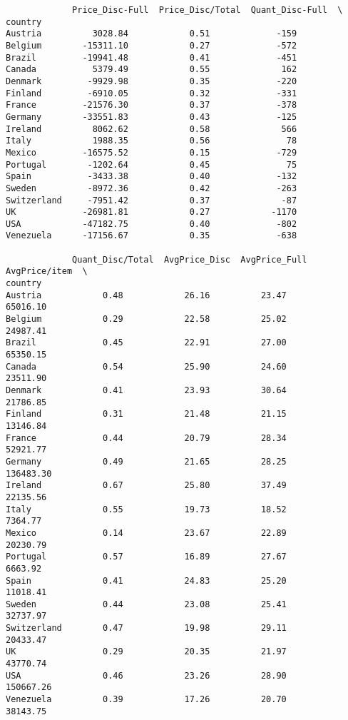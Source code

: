 \documentclass[11pt]{article}
\begin{document}
    
    \begin{verbatim}
             Price_Disc-Full  Price_Disc/Total  Quant_Disc-Full  \
country                                                           
Austria          3028.84            0.51             -159         
Belgium        -15311.10            0.27             -572         
Brazil         -19941.48            0.41             -451         
Canada           5379.49            0.55              162         
Denmark         -9929.98            0.35             -220         
Finland         -6910.05            0.32             -331         
France         -21576.30            0.37             -378         
Germany        -33551.83            0.43             -125         
Ireland          8062.62            0.58              566         
Italy            1988.35            0.56               78         
Mexico         -16575.52            0.15             -729         
Portugal        -1202.64            0.45               75         
Spain           -3433.38            0.40             -132         
Sweden          -8972.36            0.42             -263         
Switzerland     -7951.42            0.37              -87         
UK             -26981.81            0.27            -1170         
USA            -47182.75            0.40             -802         
Venezuela      -17156.67            0.35             -638         

             Quant_Disc/Total  AvgPrice_Disc  AvgPrice_Full  AvgPrice/item  \
country                                                                      
Austria            0.48            26.16          23.47         65016.10     
Belgium            0.29            22.58          25.02         24987.41     
Brazil             0.45            22.91          27.00         65350.15     
Canada             0.54            25.90          24.60         23511.90     
Denmark            0.41            23.93          30.64         21786.85     
Finland            0.31            21.48          21.15         13146.84     
France             0.44            20.79          28.34         52921.77     
Germany            0.49            21.65          28.25        136483.30     
Ireland            0.67            25.80          37.49         22135.56     
Italy              0.55            19.73          18.52          7364.77     
Mexico             0.14            23.67          22.89         20230.79     
Portugal           0.57            16.89          27.67          6663.92     
Spain              0.41            24.83          25.20         11018.41     
Sweden             0.44            23.08          25.41         32737.97     
Switzerland        0.47            19.98          29.11         20433.47     
UK                 0.29            20.35          21.97         43770.74     
USA                0.46            23.26          28.90        150667.26     
Venezuela          0.39            17.26          20.70         38143.75     


\end{verbatim}
\end{document}
